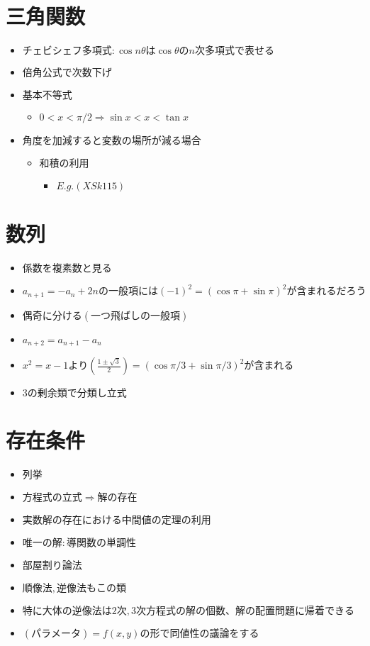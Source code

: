 \documentclass[dvipdfmx,uplatex]{jsarticle}
\begin{document}
\section{三角関数}
\begin{itemize}
	\item $ チェビシェフ多項式: \cos nθ は \cos θ の n 次多項式で表せる$
	\item $ 倍角公式で次数下げ$
	\item $ 基本不等式$
	\begin{itemize}
		\item $ 0 < x < π/2 ⇒ \sin x < x < \tan x$
	\end{itemize}
	\item $ 角度を加減すると変数の場所が減る場合$
	\begin{itemize}
		\item $ 和積の利用$
		\begin{itemize}
			\item $ E.g. (XSk115)$
		\end{itemize}
	\end{itemize}
\end{itemize}

\section{数列}
\begin{itemize}
	\item $ 係数を複素数と見る$
		\item $ a_{n+1} = -a_n + 2n の一般項には (-1)^2 = (\cos \pi + \sin \pi)^2 が含まれるだろう$
			\item $ 偶奇に分ける(一つ飛ばしの一般項)$
	\item $ a_{n+2} = a_{n+1} - a_n$
		\item $ x^2=x-1 より\left(\frac{1\pm\sqrt{3}}{2}\right) = (\cos \pi/3 + \sin \pi/3)^2 が含まれる$
		\item $ 3の剰余類で分類し立式$
\end{itemize}

\section{存在条件}
\begin{itemize}
	\item $ 列挙$
	\item $ 方程式の立式 \Rightarrow 解の存在$
		\item $ 実数解の存在における中間値の定理の利用$
		\item $ 唯一の解: 導関数の単調性$
	\item $ 部屋割り論法$
	\item $ 順像法,逆像法もこの類$
		\item $ 特に大体の逆像法は2次,3次方程式の解の個数、解の配置問題に帰着できる$
		\item $ (パラメータ) = f(x,y) の形で同値性の議論をする$
\end{itemize}
\end{document}
